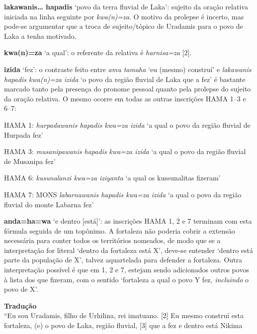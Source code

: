 \noindent\textbf{lakawanis\ldots{} hapadis} `povo da terra fluvial de Laka': sujeito da
oração relativa iniciada na linha seguinte por \emph{kwa{(n)}=za}.
O motivo da prolepse é incerto, mas pode-se argumentar que a troca de
sujeito\slash{}tópico de Uradamis para o povo de Laka a tenha motivado.

\noindent\textbf{kwa{(n)}=za} `a qual': o referente da relativa é \emph{harnisa=za}
[2].

\noindent\textbf{izida} `fez': o contraste feito entre \emph{amu tamaha} `eu (mesmo)
construí' e \emph{lakawanis hapadis kwa{(n)}=za izida} `o povo da região
fluvial de Laka que a fez' é bastante marcado tanto pela presença do pronome
pessoal quanto pela prolepse do sujeito da oração relativa.
O mesmo ocorre em todas as outras inscrições HAMA 1--3 e 6--7:
\begin{compactitem}
	\item HAMA 1: \emph{hurpadawanis hapadis kwa=za izida} `a qual o povo da região
	fluvial de Hurpada fez'
	\item HAMA 3: \emph{musanipawanis hapadis kwa=za izida} `a qual o povo da região
	fluvial de Musanipa fez'
	\item HAMA 6: \emph{kusunalanzi kwa=za iziyanta} `a qual os kussunalitas fizeram'
	\item HAMA 7: MONS \emph{labarnawanis hapadis kwa=za izida} `a qual o
	povo da região fluvial do monte Labarna fez'
\end{compactitem}

\noindent\textbf{anda=ha=wa} `e dentro [está]': as inscrições HAMA 1, 2 e 7
terminam com esta fórmula seguida de um topônimo.
A fortaleza não poderia cobrir a extensão necessária para conter todos os
territórios nomeados, de modo que se a interpretação for literal `dentro da
fortaleza está X', deve-se entender `dentro está parte da população de X',
talvez aquartelada para defender a fortaleza.
Outra interpretação possível é que em 1, 2 e 7, estejam sendo adicionados outros
povos à lista dos que fizeram, com o sentido `fortaleza a qual o povo Y fez,
\emph{incluindo} o povo de X'.


\begin{flushleft}
	\noindent \textbf{Tradução}\\
	\noindent [1] ``Eu sou Uradamis, filho de Urhilina, rei imatuano. [2] Eu mesmo
	construí esta fortaleza, (e) o povo de Laka, região fluvial, [3] que a fez e
	dentro está Nikima
\end{flushleft}

